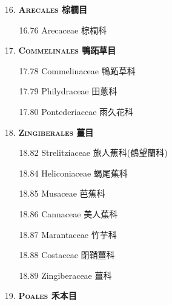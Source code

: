 \begin{enumerate}
  \item[16. ] \textbf{\textsc{Arecales} 棕櫚目}   
    \begin{enumerate}
      \item[16.76] Arecaceae 棕櫚科     
        
    \end{enumerate}
  \item[17. ] \textbf{\textsc{Commelinales} 鴨跖草目}   
    \begin{enumerate}
      \item[17.78] Commelinaceae 鴨跖草科     
        
      \item[17.79] Philydraceae 田蔥科     
        
      \item[17.80] Pontederiaceae 雨久花科     
        
    \end{enumerate}
  \item[18. ] \textbf{\textsc{Zingiberales} 薑目}   
    \begin{enumerate}
      \item[18.82] Strelitziaceae 旅人蕉科(鶴望蘭科)     
        
      \item[18.84] Heliconiaceae 蝎尾蕉科     
        
      \item[18.85] Musaceae 芭蕉科     
        
      \item[18.86] Cannaceae 美人蕉科     
        
      \item[18.87] Marantaceae 竹芋科     
        
      \item[18.88] Costaceae 閉鞘薑科     
        
      \item[18.89] Zingiberaceae 薑科     
        
    \end{enumerate}
  \item[19. ] \textbf{\textsc{Poales} 禾本目}   

\end{enumerate}
